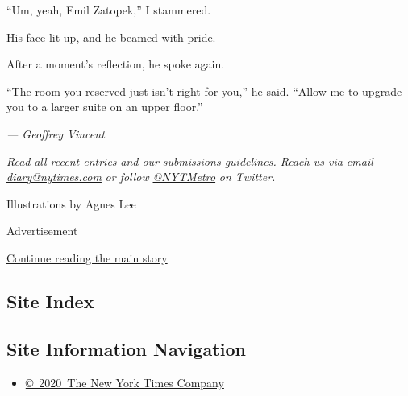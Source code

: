 ``Um, yeah, Emil Zatopek,'' I stammered.

His face lit up, and he beamed with pride.

After a moment's reflection, he spoke again.

``The room you reserved just isn't right for you,'' he said. ``Allow me
to upgrade you to a larger suite on an upper floor.''

\emph{--- Geoffrey Vincent}

\emph{Read}
\href{http://www.nytimes.com/column/metropolitan-diary}{\emph{all recent
entries}} \emph{and our}
\href{http://www.nytimes.com/2015/10/21/nyregion/how-to-submit-to-metropolitan-diary.html}{\emph{submissions
guidelines}}\emph{. Reach us via email}
\href{mailto:diary@nytimes.com}{\emph{diary@nytimes.com}} \emph{or
follow} \href{https://twitter.com/\#\%21/nytmetro}{\emph{@NYTMetro}}
\emph{on Twitter.}

Illustrations by Agnes Lee

Advertisement

\protect\hyperlink{after-bottom}{Continue reading the main story}

\hypertarget{site-index}{%
\subsection{Site Index}\label{site-index}}

\hypertarget{site-information-navigation}{%
\subsection{Site Information
Navigation}\label{site-information-navigation}}

\begin{itemize}
\tightlist
\item
  \href{https://help.nytimes.com/hc/en-us/articles/115014792127-Copyright-notice}{©~2020~The
  New York Times Company}
\end{itemize}

